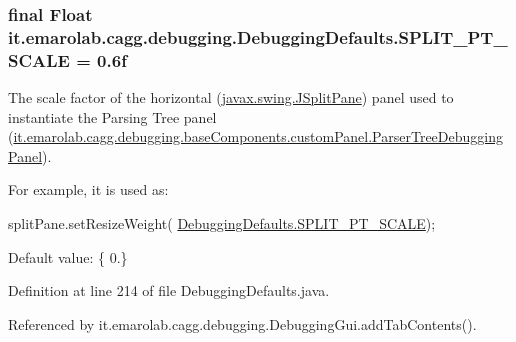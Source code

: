 \hypertarget{classit_1_1emarolab_1_1cagg_1_1debugging_1_1DebuggingDefaults_a92f2cacd93d768ea93bb352212a3041f}{
\subsubsection[{S\-P\-L\-I\-T\-\_\-\-P\-T\-\_\-\-S\-C\-A\-L\-E}]{\setlength{\rightskip}{0pt plus 5cm}final Float it.\-emarolab.\-cagg.\-debugging.\-Debugging\-Defaults.\-S\-P\-L\-I\-T\-\_\-\-P\-T\-\_\-\-S\-C\-A\-L\-E = 0.\-6f\hspace{0.3cm}{\ttfamily [static]}}}\label{classit_1_1emarolab_1_1cagg_1_1debugging_1_1DebuggingDefaults_a92f2cacd93d768ea93bb352212a3041f}
The scale factor of the horizontal (\hyperlink{}{javax.\-swing.\-J\-Split\-Pane}) panel used to instantiate the Parsing Tree panel (\hyperlink{classit_1_1emarolab_1_1cagg_1_1debugging_1_1baseComponents_1_1customPanel_1_1ParserTreeDebuggingPanel}{it.\-emarolab.\-cagg.\-debugging.\-base\-Components.\-custom\-Panel.\-Parser\-Tree\-Debugging\-Panel}).\par
 For example, it is used as\-:
\begin{DoxyCode}
splitPane.setResizeWeight( \hyperlink{classit_1_1emarolab_1_1cagg_1_1debugging_1_1DebuggingDefaults_a92f2cacd93d768ea93bb352212a3041f}{DebuggingDefaults.SPLIT\_PT\_SCALE}); 
\end{DoxyCode}
 \par
 Default value\-: \{ 0.\} 

Definition at line 214 of file Debugging\-Defaults.\-java.



Referenced by it.\-emarolab.\-cagg.\-debugging.\-Debugging\-Gui.\-add\-Tab\-Contents().


